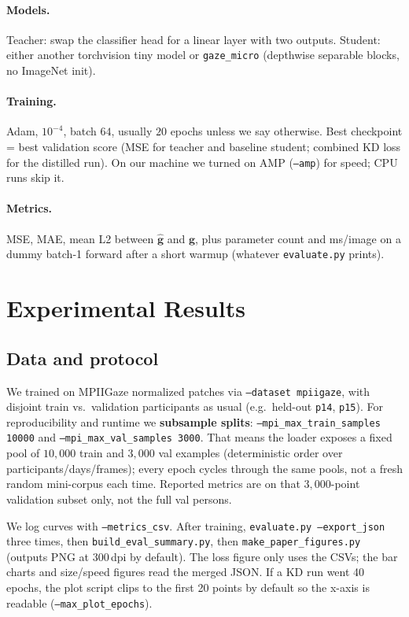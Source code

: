 \documentclass[10pt, reqno, letterpaper, twoside]{amsart}
\begin{document}
\paragraph{Models.} Teacher: swap the classifier head for a linear layer with two outputs. Student: either another torchvision tiny model or \texttt{gaze\_micro} (depthwise separable blocks, no ImageNet init).

\paragraph{Training.} Adam, $10^{-4}$, batch $64$, usually $20$ epochs unless we say otherwise. Best checkpoint = best validation score (MSE for teacher and baseline student; combined KD loss for the distilled run). On our machine we turned on AMP (\texttt{--amp}) for speed; CPU runs skip it.

\paragraph{Metrics.} MSE, MAE, mean L2 between $\hat{\mathbf{g}}$ and $\mathbf{g}$, plus parameter count and ms/image on a dummy batch-1 forward after a short warmup (whatever \texttt{evaluate.py} prints).

\section{Experimental Results}

\subsection{Data and protocol}

We trained on MPIIGaze normalized patches via \texttt{--dataset mpiigaze}, with disjoint train vs.\ validation participants as usual (e.g.\ held-out \texttt{p14}, \texttt{p15}). For reproducibility and runtime we \textbf{subsample splits}: \texttt{--mpi\_max\_train\_samples 10000} and \texttt{--mpi\_max\_val\_samples 3000}. That means the loader exposes a fixed pool of $10{,}000$ train and $3{,}000$ val examples (deterministic order over participants/days/frames); every epoch cycles through the same pools, not a fresh random mini-corpus each time. Reported metrics are on that $3{,}000$-point validation subset only, not the full val persons.

We log curves with \texttt{--metrics\_csv}. After training, \texttt{evaluate.py --export\_json} three times, then \texttt{build\_eval\_summary.py}, then \texttt{make\_paper\_figures.py} (outputs PNG at 300\,dpi by default). The loss figure only uses the CSVs; the bar charts and size/speed figures read the merged JSON. If a KD run went 40 epochs, the plot script clips to the first 20 points by default so the x-axis is readable (\texttt{--max\_plot\_epochs}).
\end{document}
